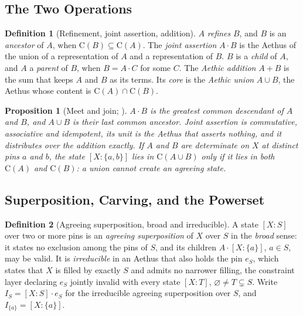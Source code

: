\documentclass[11pt]{article}
\newtheorem{proposition}{Proposition}
\theoremstyle{definition}
\newtheorem{definition}{Definition}
\newcommand{\Aethus}{Aethus}
\begin{document}
\subsection{The Two Operations}\label{sec:core_operations}

\begin{definition}[Refinement, joint assertion, addition]\label{def:core_ops}
$A$ \emph{refines} $B$, and $B$ is an \emph{ancestor} of $A$, when $\mathrm{C}(B) \subseteq \mathrm{C}(A)$. The \emph{joint assertion} $A \cdot B$ is the \Aethus{} of the union of a representation of $A$ and a representation of $B$. $B$ is a \emph{child} of $A$, and $A$ a \emph{parent} of $B$, when $B = A \cdot C$ for some $C$. The \emph{Aethic addition} $A + B$ is the sum that keeps $A$ and $B$ as its terms. Its \emph{core} is the \emph{Aethic union} $A \cup B$, the \Aethus{} whose content is $\mathrm{C}(A) \cap \mathrm{C}(B)$.
\end{definition}

\begin{proposition}[Meet and join; \cite{Aethus, AethusTree}]\label{prop:core_ops}
$A \cdot B$ is the greatest common descendant of $A$ and $B$, and $A \cup B$ is their last common ancestor. Joint assertion is commutative, associative and idempotent, its unit is the \Aethus{} that asserts nothing, and it distributes over the addition exactly. If $A$ and $B$ are determinate on $X$ at distinct pins $a$ and $b$, the state $[X : \{a, b\}]$ lies in $\mathrm{C}(A \cup B)$ only if it lies in both $\mathrm{C}(A)$ and $\mathrm{C}(B)$: a union cannot create an agreeing state.
\end{proposition}

\subsection{Superposition, Carving, and the Powerset}\label{sec:core_superposition}

\begin{definition}[Agreeing superposition, broad and irreducible]\label{def:core_agreeing}
A state $[X : S]$ over two or more pins is an \emph{agreeing superposition} of $X$ over $S$ in the \emph{broad} sense: it states no exclusion among the pins of $S$, and its children $A \cdot [X : \{a\}]$, $a \in S$, may be valid. It is \emph{irreducible} in an \Aethus{} that also holds the pin $e_S$, which states that $X$ is filled by exactly $S$ and admits no narrower filling, the constraint layer declaring $e_S$ jointly invalid with every state $[X : T]$, $\varnothing \neq T \subsetneq S$. Write $I_S = [X : S] \cdot e_S$ for the irreducible agreeing superposition over $S$, and $I_{\{a\}} = [X : \{a\}]$.
\end{definition}
\end{document}
